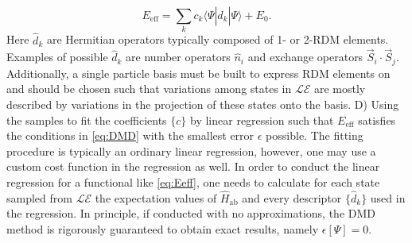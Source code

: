 \documentclass{article}
\begin{document}
\begin{equation}
E_\text{eff} = \sum_k c_k \langle \Psi | \hat{d}_k |\Psi \rangle + E_0.
\label{eq:Eeff}
\end{equation}
Here $\hat{d}_k$ are Hermitian operators typically composed of 1- or 2-RDM elements. 
Examples of possible $\hat{d}_k$ are number operators $\hat{n}_i$ and exchange operators $\vec{S}_i \cdot \vec{S}_j$.
Additionally, a single particle basis must be built to express RDM elements on and should be chosen such that variations among states in $\mathcal{LE}$ are mostly described by variations in the projection of these states onto the basis.
D) Using the samples to fit the coefficients $\{c\}$ by linear regression such that $E_\text{eff}$ satisfies the conditions in \eqref{eq:DMD} with the smallest error $\epsilon$ possible. 
The fitting procedure is typically an ordinary linear regression, however, one may use a custom cost function in the regression as well. 
In order to conduct the linear regression for a functional like \eqref{eq:Eeff}, one needs to calculate for each state sampled from $\mathcal{LE}$ the expectation values of $\hat{H}_\text{ab}$ and every descriptor $\{\hat{d}_k\}$ used in the regression.
In principle, if conducted with no approximations, the DMD method is rigorously guaranteed to obtain exact results, namely $\epsilon[\Psi] = 0$.
\end{document}
